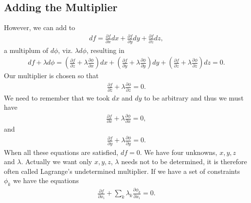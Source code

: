\documentclass[letterpaper,10pt,english]{sphinxmanual}
\begin{document}
\subsection{Adding the Multiplier}
\label{\detokenize{chapter7:adding-the-multiplier}}
However, we can add to
\begin{equation*}
\begin{split}
df = \frac{\partial f}{\partial x}dx+\frac{\partial f}{\partial y}dy+\frac{\partial f}{\partial z}dz,
\end{split}
\end{equation*}
a multiplum of \(d\phi\), viz. \(\lambda d\phi\), resulting  in
\begin{equation*}
\begin{split}
df+\lambda d\phi = (\frac{\partial f}{\partial z}+\lambda
\frac{\partial \phi}{\partial x})dx+(\frac{\partial f}{\partial y}+\lambda\frac{\partial \phi}{\partial y})dy+
(\frac{\partial f}{\partial z}+\lambda\frac{\partial \phi}{\partial z})dz =0.
\end{split}
\end{equation*}
Our multiplier is chosen so that
\begin{equation*}
\begin{split}
\frac{\partial f}{\partial z}+\lambda\frac{\partial \phi}{\partial z} =0.
\end{split}
\end{equation*}
We need to remember that we took \(dx\) and \(dy\) to be arbitrary and thus we must have
\begin{equation*}
\begin{split}
\frac{\partial f}{\partial x}+\lambda\frac{\partial \phi}{\partial x} =0,
\end{split}
\end{equation*}
and
\begin{equation*}
\begin{split}
\frac{\partial f}{\partial y}+\lambda\frac{\partial \phi}{\partial y} =0.
\end{split}
\end{equation*}
When all these equations are satisfied, \(df=0\).  We have four unknowns, \(x,y,z\) and
\(\lambda\). Actually we want only \(x,y,z\), \(\lambda\) needs not to be determined,
it is therefore often called
Lagrange’s undetermined multiplier.
If we have a set of constraints \(\phi_k\) we have the equations
\begin{equation*}
\begin{split}
\frac{\partial f}{\partial x_i}+\sum_k\lambda_k\frac{\partial \phi_k}{\partial x_i} =0.
\end{split}
\end{equation*}
\end{document}

